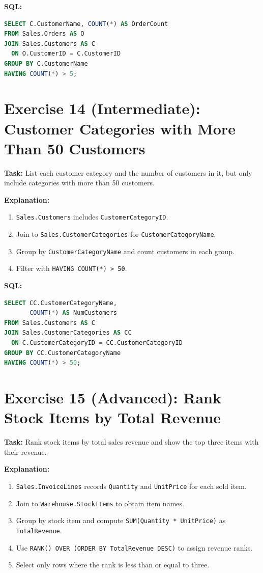 \documentclass[12pt,a4paper]{article}
\begin{document}
\textbf{SQL:}
\begin{lstlisting}[language=SQL]
SELECT C.CustomerName, COUNT(*) AS OrderCount
FROM Sales.Orders AS O
JOIN Sales.Customers AS C
  ON O.CustomerID = C.CustomerID
GROUP BY C.CustomerName
HAVING COUNT(*) > 5;
\end{lstlisting}

\section{Exercise 14 (Intermediate): Customer Categories with More Than 50 Customers}
\textbf{Task:} List each customer category and the number of customers in it, but only include categories with more than 50 customers.

\textbf{Explanation:}
\begin{enumerate}
  \item \texttt{Sales.Customers} includes \texttt{CustomerCategoryID}.
  \item Join to \texttt{Sales.CustomerCategories} for \texttt{CustomerCategoryName}.
  \item Group by \texttt{CustomerCategoryName} and count customers in each group.
  \item Filter with \texttt{HAVING COUNT(*) > 50}.
\end{enumerate}

\textbf{SQL:}
\begin{lstlisting}[language=SQL]
SELECT CC.CustomerCategoryName,
       COUNT(*) AS NumCustomers
FROM Sales.Customers AS C
JOIN Sales.CustomerCategories AS CC
  ON C.CustomerCategoryID = CC.CustomerCategoryID
GROUP BY CC.CustomerCategoryName
HAVING COUNT(*) > 50;
\end{lstlisting}

\section{Exercise 15 (Advanced): Rank Stock Items by Total Revenue}
\textbf{Task:} Rank stock items by total sales revenue and show the top three items with their revenue.

\textbf{Explanation:}
\begin{enumerate}
  \item \texttt{Sales.InvoiceLines} records \texttt{Quantity} and \texttt{UnitPrice} for each sold item.
  \item Join to \texttt{Warehouse.StockItems} to obtain item names.
  \item Group by stock item and compute \texttt{SUM(Quantity * UnitPrice)} as \texttt{TotalRevenue}.
  \item Use \texttt{RANK() OVER (ORDER BY TotalRevenue DESC)} to assign revenue ranks.
  \item Select only rows where the rank is less than or equal to three.
\end{enumerate}
\end{document}
